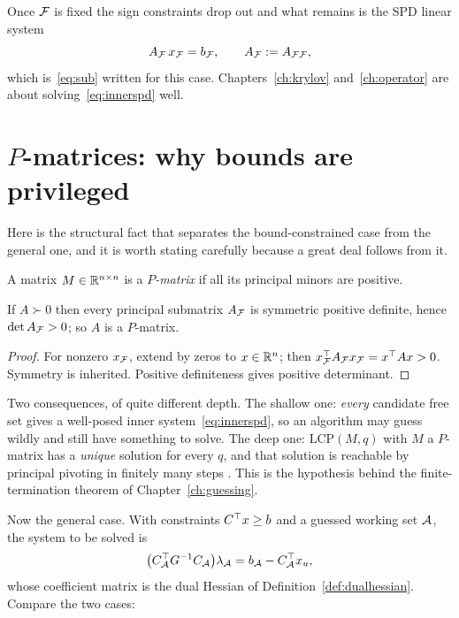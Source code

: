 Once $\mathcal{F}$ is fixed the sign constraints drop out and what remains is the SPD
linear system
\begin{equation}
  A_{\mathcal{F}}\,x_{\mathcal{F}} = b_{\mathcal{F}},
  \qquad A_{\mathcal{F}} := A_{\mathcal{F}\mathcal{F}},
  \label{eq:innerspd}
\end{equation}
which is~\eqref{eq:sub} written for this case. Chapters~\ref{ch:krylov}
and~\ref{ch:operator} are about solving~\eqref{eq:innerspd} well.

\section{$P$-matrices: why bounds are privileged}

Here is the structural fact that separates the bound-constrained case from the
general one, and it is worth stating carefully because a great deal follows from
it.

\begin{definition}[$P$-matrix]
A matrix $M \in \mathbb{R}^{n\times n}$ is a \emph{$P$-matrix} if all its principal minors
are positive.
\end{definition}

\begin{proposition}
\label{prop:spdp}
If $A \succ 0$ then every principal submatrix $A_{\mathcal{F}}$ is symmetric positive
definite, hence $\det A_{\mathcal{F}} > 0$; so $A$ is a $P$-matrix.
\end{proposition}

\begin{proof}
For nonzero $x_{\mathcal{F}}$, extend by zeros to $x \in \mathbb{R}^n$; then
$x_{\mathcal{F}}^{\top} A_{\mathcal{F}} x_{\mathcal{F}} = x^{\top} A x > 0$. Symmetry is inherited. Positive
definiteness gives positive determinant.
\end{proof}

Two consequences, of quite different depth. The shallow one: \emph{every}
candidate free set gives a well-posed inner system~\eqref{eq:innerspd}, so an
algorithm may guess wildly and still have something to solve. The deep one:
$\mathrm{LCP}(M,q)$ with $M$ a $P$-matrix has a \emph{unique} solution for every
$q$, and that solution is reachable by principal pivoting in finitely many steps
\cite{murty1988,judice1994}. This is the hypothesis behind the finite-termination
theorem of Chapter~\ref{ch:guessing}.

Now the general case. With constraints $C^{\top} x \ge b$ and a guessed working set
$\mathcal{A}$, the system to be solved is
\begin{equation}
  \bigl(C_{\mathcal{A}}^{\top} G^{-1} C_{\mathcal{A}}\bigr)\lambda_{\mathcal{A}}
   = b_{\mathcal{A}} - C_{\mathcal{A}}^{\top} x_u ,
  \label{eq:generalsystem}
\end{equation}
whose coefficient matrix is the dual Hessian of Definition~\ref{def:dualhessian}.
Compare the two cases:

